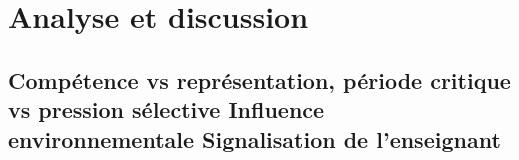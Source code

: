 \chapter{Analyse et discussion}
\section{Compétence vs représentation, période critique vs pression sélective Influence environnementale Signalisation de l'enseignant}